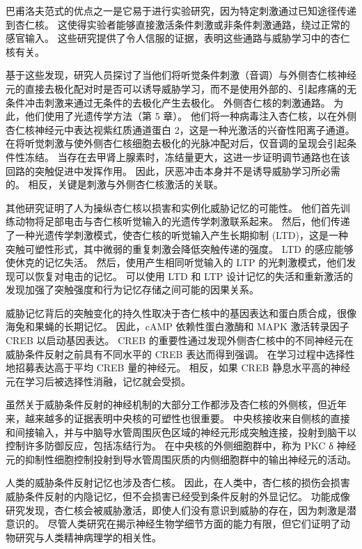 巴甫洛夫范式的优点之一是它易于进行实验研究，因为特定刺激通过已知途径传递到杏仁核。 这使得实验者能够直接激活条件刺激或非条件刺激通路，绕过正常的感官输入。 这些研究提供了令人信服的证据，表明这些通路与威胁学习中的杏仁核有关。

基于这些发现，研究人员探讨了当他们将听觉条件刺激（音调）与外侧杏仁核神经元的直接去极化配对时是否可以诱导威胁学习，而不是使用外部的、引起疼痛的无条件冲击刺激来通过无条件的去极化产生去极化。 外侧杏仁核的刺激通路。 为此，他们使用了光遗传学方法（第 5 章）。 他们将一种病毒注入杏仁核，以在外侧杏仁核神经元中表达视紫红质通道蛋白 2，这是一种光激活的兴奋性阳离子通道。 在将听觉刺激与使外侧杏仁核细胞去极化的光脉冲配对后，仅音调的呈现会引起条件性冻结。 当存在去甲肾上腺素时，冻结量更大，这进一步证明调节通路也在该回路的突触促进中发挥作用。 因此，厌恶冲击本身并不是诱导威胁学习所必需的。 相反，关键是刺激与外侧杏仁核激活的关联。

其他研究证明了人为操纵杏仁核以损害和实例化威胁记忆的可能性。 他们首先训练动物将足部电击与杏仁核听觉输入的光遗传学刺激联系起来。 然后，他们传递了一种光遗传学刺激模式，使杏仁核的听觉输入产生长期抑制 (LTD)，这是一种突触可塑性形式，其中微弱的重复刺激会降低突触传递的强度。 LTD 的感应能够使休克的记忆失活。 然后，使用产生相同听觉输入的 LTP 的光刺激模式，他们发现可以恢复对电击的记忆。 可以使用 LTD 和 LTP 设计记忆的失活和重新激活的发现加强了突触强度和行为记忆存储之间可能的因果关系。

威胁记忆背后的突触变化的持久性取决于杏仁核中的基因表达和蛋白质合成，很像海兔和果蝇的长期记忆。 因此，cAMP 依赖性蛋白激酶和 MAPK 激活转录因子 CREB 以启动基因表达。 CREB 的重要性通过发现外侧杏仁核中的不同神经元在威胁条件反射之前具有不同水平的 CREB 表达而得到强调。 在学习过程中选择性地招募表达高于平均 CREB 量的神经元。 相反，如果 CREB 静息水平高的神经元在学习后被选择性消融，记忆就会受损。

虽然关于威胁条件反射的神经机制的大部分工作都涉及杏仁核的外侧核，但近年来，越来越多的证据表明中央核的可塑性也很重要。 中央核接收来自侧核的直接和间接输入，并与中脑导水管周围灰色区域的神经元形成突触连接，投射到脑干以控制许多防御反应，包括冻结行为。 在中央核的外侧细胞群中，称为 PKC δ 神经元的抑制性细胞控制投射到导水管周围灰质的内侧细胞群中的输出神经元的活动。

人类的威胁条件反射记忆也涉及杏仁核。 因此，在人类中，杏仁核的损伤会损害威胁条件反射的内隐记忆，但不会损害已经受到条件反射的外显记忆。 功能成像研究发现，杏仁核会被威胁激活，即使人们没有意识到威胁的存在，因为刺激是潜意识的。 尽管人类研究在揭示神经生物学细节方面的能力有限，但它们证明了动物研究与人类精神病理学的相关性。

